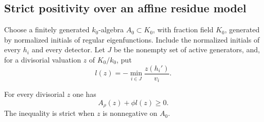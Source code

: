 \subsection{Strict positivity over an affine residue model}

Choose a finitely generated $k_0$-algebra $A_0\subset K_0$, with
fraction field $K_0$, generated by normalized initials of regular
eigenfunctions. Include the normalized initials of every $h_i$ and
every detector. Let $J$ be the nonempty set of active generators,
and, for a divisorial valuation $z$ of $K_0/k_0$, put
\begin{equation}\label{car:l-definition}
 l(z)=-\min_{i\in J}\frac{z(h_i')}{v_i}.
\end{equation}

\begin{lemma}\label{car:strict-inequality}
For every divisorial $z$ one has
\begin{equation}\label{car:strict}
 A_\rho(z)+\phi l(z)\ge0.
\end{equation}
The inequality is strict when $z$ is nonnegative on $A_0$.
\end{lemma}

